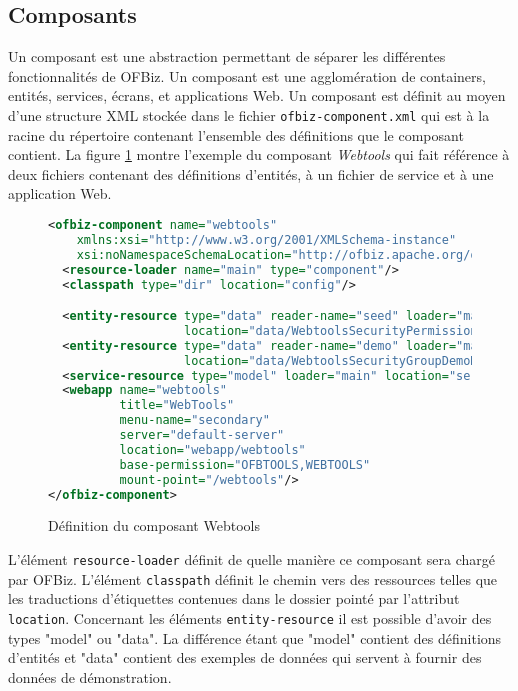 \documentclass[a4paper, 11pt]{report}
\begin{document}
\subsection{Composants}

Un composant est une abstraction permettant de séparer les différentes
fonctionnalités de OFBiz. Un composant est une agglomération de
containers, entités, services, écrans, et applications Web. Un
composant est définit au moyen d'une structure XML stockée dans le
fichier \verb=ofbiz-component.xml= qui est à la racine du répertoire
contenant l'ensemble des définitions que le composant contient. La
figure \ref{fig:ofbizcomponent} montre l'exemple du composant
\emph{Webtools} qui fait référence à deux fichiers contenant des
définitions d'entités, à un fichier de service et à une application
Web.

\begin{figure}
  \begin{lstlisting}[language=xml]
<ofbiz-component name="webtools"
    xmlns:xsi="http://www.w3.org/2001/XMLSchema-instance"
    xsi:noNamespaceSchemaLocation="http://ofbiz.apache.org/dtds/ofbiz-component.xsd">
  <resource-loader name="main" type="component"/>
  <classpath type="dir" location="config"/>

  <entity-resource type="data" reader-name="seed" loader="main"
                   location="data/WebtoolsSecurityPermissionSeedData.xml"/>
  <entity-resource type="data" reader-name="demo" loader="main"
                   location="data/WebtoolsSecurityGroupDemoData.xml"/>
  <service-resource type="model" loader="main" location="servicedef/services.xml"/>
  <webapp name="webtools"
          title="WebTools"
          menu-name="secondary"
          server="default-server"
          location="webapp/webtools"
          base-permission="OFBTOOLS,WEBTOOLS"
          mount-point="/webtools"/>
</ofbiz-component>
  \end{lstlisting}
  \caption{Définition du composant Webtools}
  \label{fig:ofbizcomponent}
\end{figure}

L'élément \verb=resource-loader= définit de quelle manière ce
composant sera chargé par OFBiz. L'élément \verb=classpath= définit le
chemin vers des ressources telles que les traductions d'étiquettes
contenues dans le dossier pointé par l'attribut
\verb=location=. Concernant les éléments \verb=entity-resource= il est
possible d'avoir des types "model" ou "data". La différence étant que
"model" contient des définitions d'entités et "data" contient des
exemples de données qui servent à fournir des données de
démonstration.
\end{document}

